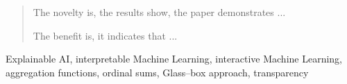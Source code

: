 \documentclass[a4paper,5p,review]{elsarticle}
\begin{document}
\begin{frontmatter}
\begin{abstract}
The novelty is, the results show, the paper demonstrates ...

The benefit is, it indicates that ...



\end{abstract}

\begin{keyword}
Explainable AI, interpretable Machine Learning, interactive Machine Learning, aggregation functions, ordinal sums, Glass--box approach, transparency 
\end{keyword}

\end{frontmatter}
\linenumbers



\end{document}

